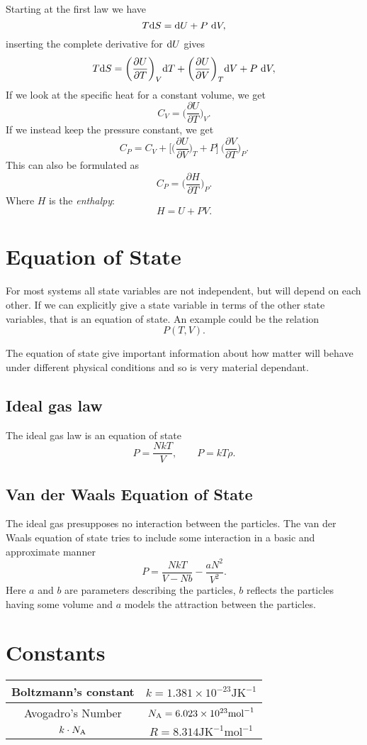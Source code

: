 \documentclass[a4paper, 11pt, notitlepage, english]{article}
\renewcommand{\d}{{\rm d}}
\renewcommand{\b}{\bigg}
\newcommand{\p}{\partial}
\begin{document}
Starting at the first law we have
$$T \d S = \d U + P\ \d V,$$
inserting the complete derivative for $\d U$ gives
$$T \d S = \b(\frac{\p U}{\p T}\b)_V \d T + \b(\frac{\p U}{\p V}\b)_T \d V + P\ \d V,$$
If we look at the specific heat for a constant volume, we get
$$C_V = \b(\frac{\p U}{\p T}\b)_V.$$
If we instead keep the pressure constant, we get
$$C_P = C_V + \b[\b(\frac{\p U}{\p V}\b)_T + P\b]\ \b(\frac{\p V}{\p T}\b)_P.$$
This can also be formulated as
$$C_P = \b(\frac{\p H}{\p T}\b)_P.$$
Where $H$ is the \emph{enthalpy}:
$$H = U + PV.$$

\section*{Equation of State}
For most systems all state variables are not independent, but will depend on each other. If we can explicitly give a state variable in terms of the other state variables, that is an equation of state. An example could be the relation $$P(T,V).$$
 
The equation of state give important information about how matter will behave under different physical conditions and so is very material dependant.

\subsection*{Ideal gas law}
The ideal gas law is an equation of state
$$P = \frac{NkT}{V}, \qquad P = kT\rho.$$

\subsection*{Van der Waals Equation of State}
The ideal gas presupposes no interaction between the particles. The van der Waals equation of state tries to include some interaction in a basic and approximate manner
$$P = \frac{NkT}{V - Nb} - \frac{aN^2}{V^2}.$$
Here $a$ and $b$ are parameters describing the particles, $b$ reflects the particles having some volume and $a$ models the attraction between the particles.




\section*{Constants}

\begin{center}
\begin{tabular}{|c|c|}	
\hline
Boltzmann's constant & $k = 1.381\times10^{-23} \mbox{JK}^{-1}$ \\ \hline 
Avogadro's Number & $N_{\rm A} = 6.023\times10^{23} \mbox{mol}^{-1}$ \\ \hline 
$k\cdot N_{\rm A}$ & $R = 8.314 \mbox{JK}^{-1}\mbox{mol}^{-1}$ \\ \hline
\end{tabular}
\end{center}
\end{document}
